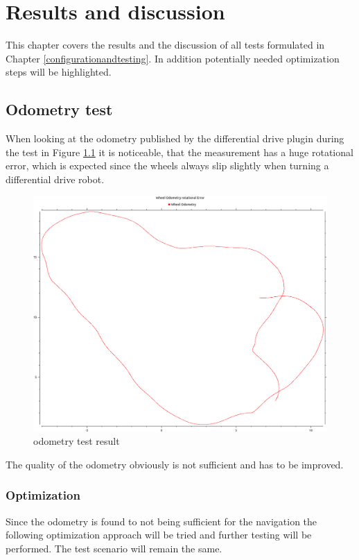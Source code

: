\chapter{Results and discussion}
\label{resultanddiscussion}


This chapter covers the results and the discussion of all tests formulated in Chapter \ref{configurationandtesting}. In addition potentially needed optimization steps will be highlighted.
\section{Odometry test}

When looking at the odometry published by the differential drive plugin during the test in Figure \ref{wheel odom} it is noticeable, that the measurement has a huge rotational error, which is expected since the wheels always slip slightly when turning a differential drive robot.
\begin{figure}[H]
	\includegraphics[width=\textwidth]{Pictures/rot error}
	\caption{odometry test result}
	\label{wheel odom}

\end{figure}
The quality of the odometry obviously is not sufficient and has to be improved.

\subsection{Optimization}
Since the odometry is found to not being sufficient for the navigation the following optimization approach will be tried and further testing will be performed. The test scenario will remain the same.

